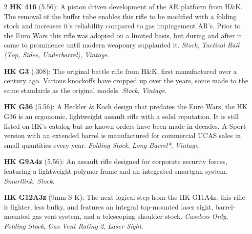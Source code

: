 \documentclass[
  oneside]{article}
\begin{document}
\begin{multicols}{2}
\textbf{HK 416} (5.56): A piston driven
development of the AR platform from H\&K. The
removal of the buffer tube enables this rifle to
be modified with a folding stock and increases
it's reliability compared to gas impingement AR's.
Prior to the Euro Wars this rifle was adopted on a
limited basis, but during and after it came to
prominence until modern weaponry supplanted it.
\emph{Stock}, \emph{Tactical Rail (Top, Sides,
Underbarrel)}, \emph{Vintage}.

\textbf{HK G3} (.308): The original battle rifle
from H\&K, first manufactured over a century ago.
Various knockoffs have cropped up over the years,
some made to the same standards as the original
models. \emph{Stock}, \emph{Vintage}.

\textbf{HK G36} (5.56): A Heckler \& Koch design
that predates the Euro Wars, the HK G36 is an
ergonomic, lightweight assault rifle with a solid
reputation. It is still listed on HK's catalog but
no known orders have been made in decades. A Sport
version with an extended barrel is manufactured
for commercial UCAS sales in small quantities
every year. \emph{Folding Stock}, \emph{Long
Barrel*}, \emph{Vintage}.

\textbf{HK G9A4z} (5.56): An assault rifle
designed for corporate security forces, featuring
a lightweight polymer frame and an integrated
smartgun system. \emph{Smartlink}, \emph{Stock}.

\textbf{HK G12A3z} (9mm S-K): The next logical
step from the HK G11A4z, this rifle is lighter,
less bulky, and features an integral top-mounted
laser sight, barrel-mounted gas vent system, and a
telescoping shoulder stock. \emph{Caseless Only},
\emph{Folding Stock}, \emph{Gas Vent Rating 2},
\emph{Laser Sight}.


\end{multicols}
\end{document}
